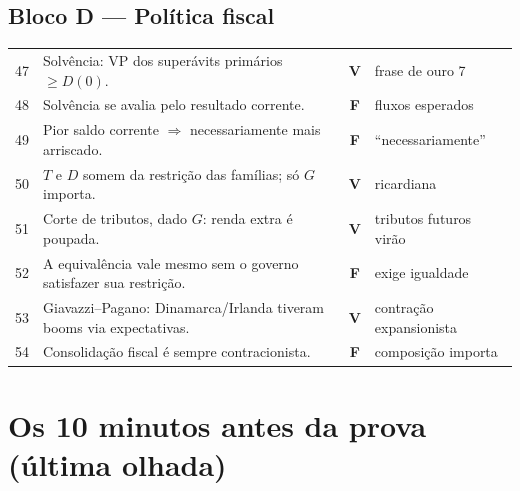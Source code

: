 \documentclass[12pt, a4paper]{article}
\newcommand{\Vok}{\textbf{\textcolor{greenbox}{V}}}
\newcommand{\Fno}{\textbf{\textcolor{redf}{F}}}
\begin{document}
\subsection*{Bloco D --- Política fiscal}
{\footnotesize
\renewcommand{\arraystretch}{1.3}
\begin{tabular}{p{0.5cm} p{9.2cm} c p{3.6cm}}
\toprule
47 & Solvência: VP dos superávits primários $\geq D(0)$. &
\Vok & frase de ouro 7 \\
48 & Solvência se avalia pelo resultado corrente. &
\Fno & fluxos esperados \\
49 & Pior saldo corrente $\Rightarrow$ necessariamente mais arriscado. &
\Fno & ``necessariamente'' \\
50 & $T$ e $D$ somem da restrição das famílias; só $G$ importa. &
\Vok & ricardiana \\
51 & Corte de tributos, dado $G$: renda extra é poupada. &
\Vok & tributos futuros virão \\
52 & A equivalência vale mesmo sem o governo satisfazer sua restrição. &
\Fno & exige igualdade \\
53 & Giavazzi--Pagano: Dinamarca/Irlanda tiveram booms via expectativas. &
\Vok & contração expansionista \\
54 & Consolidação fiscal é sempre contracionista. &
\Fno & composição importa \\
\bottomrule
\end{tabular}
}

\section{Os 10 minutos antes da prova (última olhada)}
\end{document}
